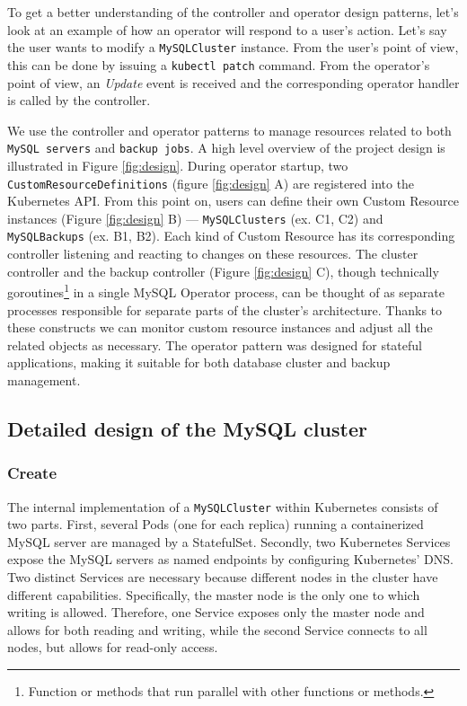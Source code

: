 To get a better understanding of the controller and operator design patterns, let’s look at an
example of how an operator will respond to a user’s action. Let’s say the user wants to modify a
\texttt{MySQLCluster} instance. From the user’s point of view, this can be done by issuing a
\texttt{kubectl patch} command. From the operator’s point of view, an \textit{Update} event is
received and the corresponding operator handler is called by the controller.

We use the controller and operator patterns to manage resources related to both 
\texttt{MySQL servers} and \texttt{backup jobs}. A high level overview of the project design is
illustrated in Figure \ref{fig:design}. During operator startup, two
\texttt{CustomResourceDefinitions} (figure \ref{fig:design} A) are registered into the Kubernetes API.
From this point on, users can define their own Custom Resource instances (Figure \ref{fig:design} B) ---
\texttt{MySQLClusters} (ex. C1, C2) and \texttt{MySQLBackups} (ex. B1, B2). Each kind of
Custom Resource has its corresponding controller listening and reacting to changes on these
resources. The cluster controller and the backup controller (Figure \ref{fig:design} C), though technically
goroutines\footnote{Function or methods that run parallel with other functions or methods.} in a single
MySQL Operator process, can be thought of as separate processes responsible for separate parts of the
cluster’s architecture. Thanks to these constructs we can monitor custom resource instances and adjust
all the related objects as necessary. The operator pattern was designed for stateful applications, making
it suitable for both database cluster and backup management.~\cite{coreos}

\subsection{Detailed design of the MySQL cluster}

\subsubsection*{Create}
The internal implementation of a \texttt{MySQLCluster} within Kubernetes consists of two parts. First,
several Pods (one for each replica) running a containerized MySQL server are managed by a
StatefulSet. Secondly, two Kubernetes Services expose the MySQL servers as named endpoints by
configuring Kubernetes’ DNS. Two distinct Services are necessary because different nodes in the
cluster have different capabilities. Specifically, the master node is the only one to which writing
is allowed. Therefore, one Service exposes only the  master node and allows for both reading and
writing, while the second Service connects to all nodes, but allows for read-only access. 

